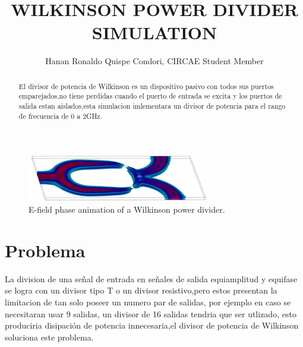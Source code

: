 \documentclass[a4paper]{IEEEtran} %
\begin{document}
\title{WILKINSON POWER DIVIDER SIMULATION}
\author{Hanan Ronaldo Quispe Condori, CIRCAE Student Member}
\maketitle
\begin{abstract}
El divisor de potencia de Wilkinson es un dispositivo pasivo con todos sus puertos emparejados,no tiene perdidas cuando el puerto de entrada se excita y los puertos de salida estan aislados,esta simulacion imlementara un divisor de potencia para el rango de frecuencia de 0 a 2GHz.
\end{abstract}
\begin{figure}[h]
    \centering
        \includegraphics[width=8cm]{imagenes/img2}
        \caption{E-field phase animation of a Wilkinson power divider.}
        \label{fig E-field phase animation of a Wilkinson power divider.}
\end{figure}
\section{Problema}
La division de una señal de entrada en señales de salida equiamplitud y equifase se logra con un divisor tipo T o un divisor resistivo,pero estos presentan la limitacion de tan solo poseer un numero par de salidas, por ejemplo en caso se necesitaran usar 9 salidas, un divisor de 16 salidas tendria que ser utlizado, esto produciria disipación de potencia innecesaria,el divisor de potencia de Wilkinson soluciona este problema.
\end{document}

